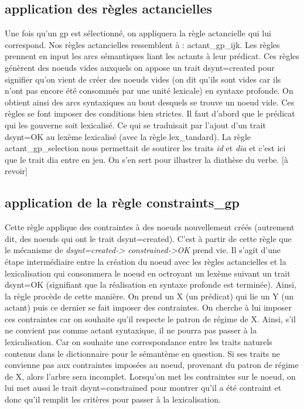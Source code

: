 \subsection{application des règles actancielles}
Une fois qu'un gp est sélectionné, on appliquera la règle actancielle qui lui correspond. Nos règles actancielles ressemblent à : actant{\_}gp{\_}ijk. Les règles prennent en input les arcs sémantiques liant les actants à leur prédicat. Ces règles génèrent des noeuds vides auxquels on appose un trait dsynt=created pour signifier qu'on vient de créer des noeuds vides (on dit qu'ils sont vides car ils n'ont pas encore été consommés par une unité lexicale) en syntaxe profonde. On obtient ainsi des arcs syntaxiques au bout desquels se trouve un noeud vide. Ces règles se font imposer des conditions bien strictes. Il faut d'abord que le prédicat qui les gouverne soit lexicalisé. Ce qui se traduisait par l'ajout d'un trait dsynt=OK au lexème lexicalisé (avec la règle lex{\_}tandard). La règle actant{\_}gp{\_}selection nous permettait de soutirer les traits  \emph{ id} et \emph{dia} et c'est ici que le trait dia entre en jeu. On s'en sert pour illustrer la diathèse du verbe. [à revoir]

\subsection{application de la règle constraints{\_}gp}
Cette règle applique des contraintes à des noeuds nouvellement créés (autrement dit, des noeuds qui ont le trait dsynt=created). C'est à partir de cette règle que le mécanisme de \emph{dsynt=created-> constrained->OK} prend vie. Il s'agit d'une étape intermédiaire entre la création du noeud avec les règles actancielles et la lexicalisation qui consommera le noeud en octroyant un lexème suivant un trait dsynt=OK (signifiant que la réalisation en syntaxe profonde est terminée). Ainsi, la règle procède de cette manière. On prend un X (un prédicat) qui lie un Y (un actant) puis ce dernier se fait imposer des contraintes. On cherche à lui imposer ces contraintes car on souhaite qu'il respecte le patron de régime de X. Ainsi, s'il ne convient pas comme actant syntaxique, il ne pourra pas passer à la lexicalisation. Car on souhaite une correspondance entre les traits naturels contenus dans le dictionnaire pour le sémantème en question. Si ses traits ne convienne pas aux contraintes imposées au noeud, provenant du patron de régime de X, alors l'arbre sera incomplet. Lorsqu'on met les contraintes sur le noeud, on lui met aussi le trait dsynt=constrained pour montrer qu'il a été contraint et donc qu'il remplit les critères pour passer à la lexicalisation.

